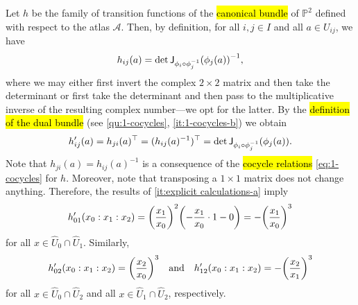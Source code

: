 \documentclass[a4paper]{amsart}
\newcommand{\Jac}[2]{\mathsf{J}_{#1}\paren*{#2}}
\renewcommand{\P}{\mathbb{P}}
\theoremstyle{remark}
\numberwithin{equation}{question}
\DeclarePairedDelimiter\paren{(}{)}
\begin{document}
\begin{solution}
\begin{solenum}
\item Let $h$ be the family of transition functions of the \hl{canonical bundle} of $\P^2$ defined with respect to the atlas $\mathcal A$. Then, by definition, for all $i,j \in I$ and all $a \in U_{ij}$, we have
\[
h_{ij}(a) = \det \Jac{\phi_i \circ \phi_j^{-1}}{\phi_j(a)}^{-1},
\]
where we may either first invert the complex $2\times2$ matrix and then take the determinant or first take the determinant and then pass to the multiplicative inverse of the resulting complex number---we opt for the latter. By the \hl{definition of the dual bundle} (see \cref{qu:1-cocycles}, \cref{it:1-cocycles-b}) we obtain
\[
h'_{ij}(a) = h_{ji}(a)^\top = (h_{ij}(a)^{-1})^\top = \det \Jac{\phi_i \circ \phi_j^{-1}}{\phi_j(a)}.
\]
Note that $h_{ji}(a) = h_{ij}(a)^{-1}$ is a consequence of the \hl{cocycle relations} \cref{eq:1-cocycles} for $h$. Moreover, note that transposing a $1\times1$ matrix does not change anything. Therefore, the results of \cref{it:explicit calculations-a} imply
\[
h'_{01}(x_0:x_1:x_2) = \paren*{\frac{x_1}{x_0}}^2\paren*{-\frac{x_1}{x_0}\cdot 1 - 0} = -\paren*{\frac{x_1}{x_0}}^3
\]
for all $x \in \hat U_0 \cap \hat U_1$. Similarly,
\[
h'_{02}(x_0:x_1:x_2) = \paren*{\frac{x_2}{x_0}}^3 \quad \text{and} \quad h'_{12}(x_0:x_1:x_2) = -\paren*{\frac{x_2}{x_1}}^3
\]
for all $x \in \hat U_0 \cap \hat U_2$ and all $x \in \hat U_1 \cap \hat U_2$, respectively.


\end{solenum}
\end{solution}
\end{document}
